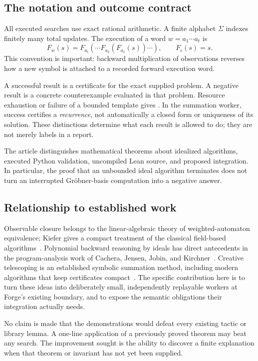 \subsection{The notation and outcome contract}

All executed searches use exact rational arithmetic. A finite alphabet
$\Sigma$ indexes finitely many total updates. The execution of a word
$w=a_1\cdots a_t$ is
\[
 F_w(s)=F_{a_t}(\cdots F_{a_2}(F_{a_1}(s))\cdots),
 \qquad F_\epsilon(s)=s.
\]
This convention is important: backward multiplication of observations reverses
how a new symbol is attached to a recorded forward execution word.

A successful result is a certificate for the exact supplied problem. A negative
result is a concrete counterexample evaluated in that problem. Resource
exhaustion or failure of a bounded template gives \Unknown. In the summation
worker, success certifies a \emph{recurrence}, not automatically a closed form
or uniqueness of its solution. These distinctions determine what each result
is allowed to do; they are not merely labels in a report.

The article distinguishes mathematical theorems about idealized algorithms,
executed Python validation, uncompiled Lean source, and proposed integration.
In particular, the proof that an unbounded ideal algorithm terminates does not
turn an interrupted Gr\"obner-basis computation into a negative answer.

\subsection{Relationship to established work}

Observable closure belongs to the linear-algebraic theory of weighted-automaton
equivalence; Kiefer gives a compact treatment of the classical field-based
algorithms~\cite{kiefer}. Polynomial backward reasoning by ideals has direct
antecedents in the program-analysis work of Cachera, Jensen, Jobin, and
Kirchner~\cite{cachera,celtique}. Creative telescoping is an established symbolic
summation method, including modern algorithms that keep certificates
compact~\cite{brochet-salvy}. The specific contribution here is to turn these
ideas into deliberately small, independently replayable workers at Forge's
existing boundary, and to expose the semantic obligations their integration
actually needs.

No claim is made that the demonstrations would defeat every existing tactic or
library lemma. A one-line application of a previously proved theorem may beat
any search. The improvement sought is the ability to discover a finite
explanation when that theorem or invariant has not yet been supplied.
